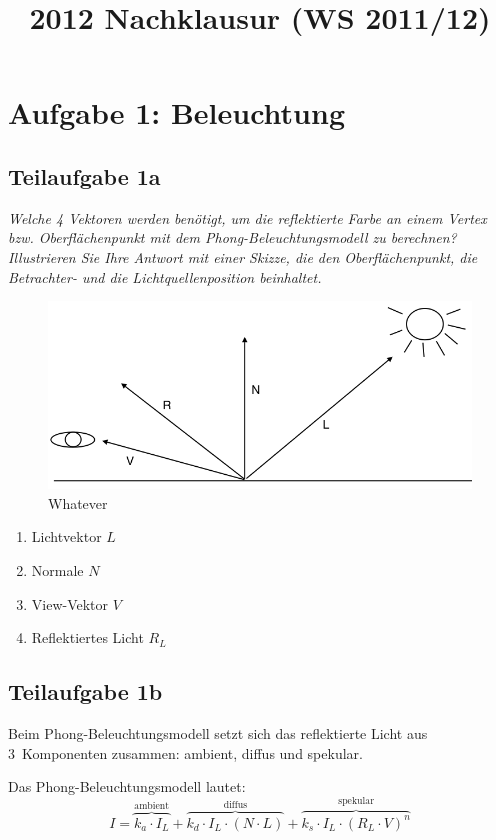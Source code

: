 \documentclass[a4paper]{scrartcl}
\begin{document}
\title{2012 Nachklausur (WS 2011/12)}

\setcounter{section}{1}
\section*{Aufgabe 1: Beleuchtung}
\subsection*{Teilaufgabe 1a}
\textit{Welche 4 Vektoren werden benötigt, um die reflektierte Farbe an einem Vertex bzw.
Oberflächenpunkt mit dem Phong-Beleuchtungsmodell zu berechnen? Illustrieren
Sie Ihre Antwort mit einer Skizze, die den Oberflächenpunkt, die Betrachter-
und die Lichtquellenposition beinhaltet.}

\begin{figure}[h]
    \centering
    \includegraphics*[width=0.8\linewidth, keepaspectratio]{1a.png}
    \caption{Whatever}
    \label{fig:1a}
\end{figure}

\begin{enumerate}
    \item Lichtvektor $L$
    \item Normale $N$
    \item View-Vektor $V$
    \item Reflektiertes Licht $R_L$
\end{enumerate}


\subsection*{Teilaufgabe 1b}
Beim Phong-Beleuchtungsmodell setzt sich das reflektierte Licht aus 3~Komponenten
zusammen: ambient, diffus und spekular.

\begin{mdframed}
Das Phong-Beleuchtungsmodell lautet:
\[I = \overbrace{k_a \cdot I_L}^{\text{ambient}}
    + \overbrace{k_d \cdot I_L \cdot (N \cdot L)}^{\text{diffus}}
    + \overbrace{k_s \cdot I_L \cdot (R_L \cdot V)^n}^{\text{spekular}}\]
\end{mdframed}
\end{document}
